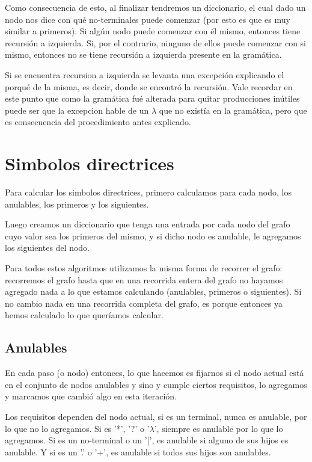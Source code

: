 \documentclass[a4paper]{report}
\begin{document}
	Como consecuencia de esto, al finalizar tendremos un diccionario, el cual dado un nodo nos
dice con qué no-terminales puede comenzar (por esto es que es muy similar a
primeros). Si algún nodo puede comenzar con él mismo, entonces tiene recursión a
izquierda. Si, por el contrario, ninguno de ellos puede comenzar con si mismo, entonces no se tiene
recursión a izquierda presente en la gramática.

	Si se encuentra recursion a izquierda se levanta una excepción explicando el porqué de la misma, es decir, donde se encontró la recursión. Vale recordar en este punto que como la gramática fué alterada para quitar producciones inútiles puede ser que la excepcion hable de un $\lambda$ que no existía en la gramática, pero que es consecuencia del procedimiento antes explicado.


\section*{Simbolos directrices}

Para calcular los simbolos directrices, primero calculamos para cada nodo, los
anulables, los primeros y los siguientes.


Luego creamos un diccionario que tenga una entrada por cada nodo del grafo cuyo
valor sea los primeros del mismo, y si dicho nodo es anulable, le agregamos los
siguientes del nodo.


Para todos estos algoritmos utilizamos la misma forma de recorrer el grafo:
recorremos el grafo hasta que en una recorrida entera del grafo no hayamos
agregado nada a lo que estamos calculando (anulables, primeros o siguientes). Si
no cambio nada en una recorrida completa del grafo, es porque entonces ya hemos
calculado lo que queríamos calcular.

\subsection*{Anulables}

	En cada paso (o nodo) entonces, lo que hacemos es fijarnos si el nodo
actual está en el conjunto de nodos anulables y sino y cumple ciertos
requisitos, lo agregamos y marcamos que cambió algo en esta iteración.


	Los requisitos dependen del nodo actual, si es un terminal, nunca es
anulable, por lo que no lo agregamos. Si es '*', '?' o '$\lambda$', siempre es anulable
por lo que lo agregamos. Si es un no-terminal o un '|', es anulable si alguno de
sus hijos es anulable. Y si es un '.' o '+', es anulable si todos sus hijos son
anulables.
\end{document}
